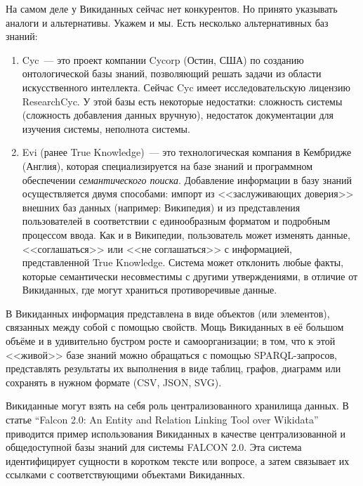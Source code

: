 На самом деле у Викиданных сейчас нет конкурентов. Но принято указывать аналоги и альтернативы. Укажем и мы. Есть несколько альтернативных баз знаний:
\begin{enumerate}
\item Cyc~--- это проект компании Cycorp (Остин, США) по созданию онтологической базы знаний, позволяющий решать задачи из области искусственного интеллекта\cite{Cyc}. Сейчас Cyc имеет исследовательскую лицензию ResearchCyc. У этой базы есть некоторые недостатки: сложность системы (сложность добавления данных
вручную), недостаток документации для изучения системы, неполнота системы.
\item Evi (ранее True Knowledge\cite{True_Knowledge})~--- это технологическая компания в Кембридже (Англия), которая специализируется на базе знаний и программном обеспечении \textit{семантического поиска}\footnotemark.  Добавление информации в базу знаний осуществляется двумя способами: импорт из <<заслуживающих доверия>> внешних баз данных (например: Википедия) и из представления пользователей в соответствии с единообразным форматом и подробным процессом ввода. Как и в Википедии, пользователь может изменять
данные, <<соглашаться>> или <<не соглашаться>> с информацией, представленной True Knowledge. Система может отклонить любые факты, которые семантически несовместимы с другими утверждениями, в отличие от Викиданных, где могут
храниться противоречивые данные.
\end{enumerate}
В Викиданных информация представлена в виде объектов (или элементов), связанных между собой с помощью свойств\footnotemark {}. Мощь Викиданных в её большом объёме и в удивительно бустром росте и самоорганизации; в том, что к этой <<живой>> базе знаний можно обращаться с помощью  SPARQL-запросов, представлять результаты их выполнения в виде таблиц, графов, диаграмм или сохранять в нужном формате (CSV, JSON, SVG).

Викиданные могут взять на себя роль централизованного хранилища данных. В статье ``Falcon 2.0: An Entity and Relation Linking Tool over Wikidata''\cite{Falcon_2.0} приводится пример использования Викиданных в качестве централизованной и общедоступной базы знаний для системы FALCON 2.0. Эта система идентифицирует сущности в коротком тексте или вопросе, а затем связывает их ссылками с соответствующими объектами Викиданных.

